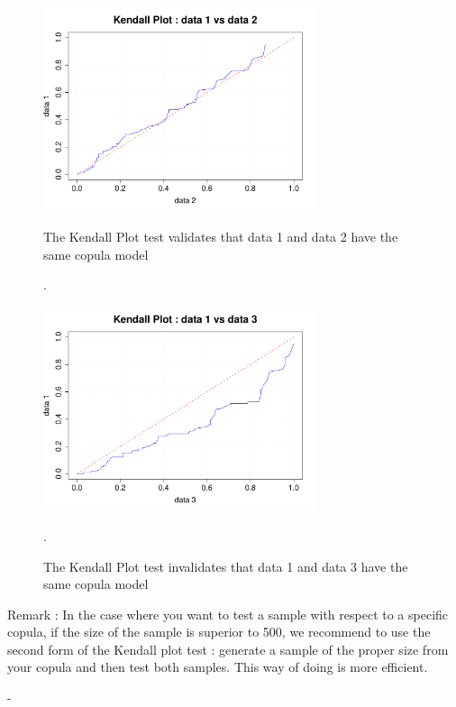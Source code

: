 {  \begin{figure}[H]
    \begin{minipage}{8cm}
      \begin{center}
        \includegraphics[width=8cm]{Figures/KendallPlotSample.pdf}
      \end{center}
      \caption{The Kendall Plot test validates that data 1 and data 2 have the same copula model}.
      \label{SameCop}
    \end{minipage}
    \hfill
    \begin{minipage}{8cm}
      \begin{center}
        \includegraphics[width=8cm]{Figures/KendallPlotSampleBad.pdf}
      \end{center}
      \caption{The Kendall Plot test invalidates that data 1 and data 3 have the same copula model}.
      \label{DifCop}
    \end{minipage}
  \end{figure}




  Remark :  In the case where you want to test a sample with respect to a specific copula, if the size of the sample is superior to 500, we recommend to use the second form of the Kendall plot test : generate a sample of the proper size from your copula and then test both samples. This way of doing is more efficient.


}
{
  -
}

